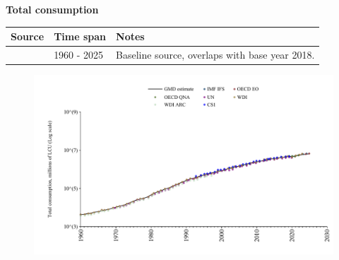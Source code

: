 \documentclass[12pt,a4paper,landscape]{article}
\begin{document}
\begin{adjustbox}{max totalsize={\paperwidth}{\paperheight},center}
\begin{minipage}[t][\textheight][t]{\textwidth}
\vspace*{0.5cm}
{}
\begin{center}
{\Large\bfseries Total consumption}
\end{center}
\vspace{0.5cm}
\begin{table}[H]
\centering
\small
\begin{tabular}{|l|l|l|}
\hline
\textbf{Source} & \textbf{Time span} & \textbf{Notes} \\
\hline
\rowcolor{white}\cite{OECD_EO}& 1960 - 2025 &Baseline source, overlaps with base year 2018. \\
\hline
\end{tabular}
\end{table}
\begin{figure}[H]
\centering
\includegraphics[width=\textwidth,height=0.6\textheight,keepaspectratio]{graphs/ZAF_cons.pdf}
\end{figure}
\end{minipage}
\end{adjustbox}
\end{document}
